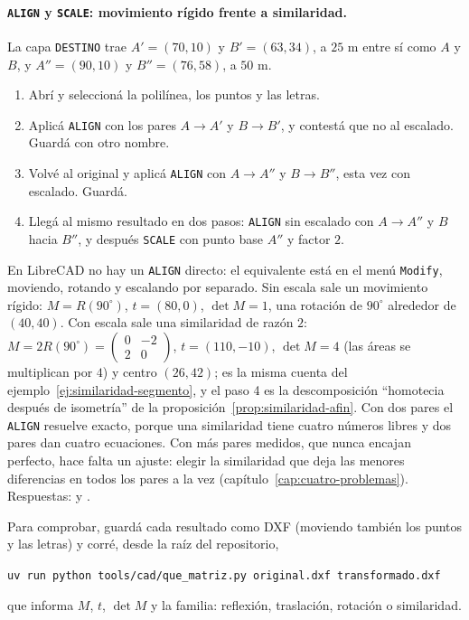 \paragraph{\texttt{ALIGN} y \texttt{SCALE}: movimiento rígido frente a similaridad.} La capa
\texttt{DESTINO} trae \(A'=(70,10)\) y \(B'=(63,34)\), a \(25\) m entre sí como \(A\) y \(B\), y
\(A''=(90,10)\) y \(B''=(76,58)\), a \(50\) m.
\begin{enumerate}
  \item Abrí  y seleccioná la polilínea, los puntos y las letras.
  \item Aplicá \texttt{ALIGN} con los pares \(A\to A'\) y \(B\to B'\), y contestá que no al
  escalado. Guardá con otro nombre.
  \item Volvé al original y aplicá \texttt{ALIGN} con \(A\to A''\) y \(B\to B''\), esta vez
  con escalado. Guardá.
  \item Llegá al mismo resultado en dos pasos: \texttt{ALIGN} sin escalado con \(A\to A''\) y
  \(B\) hacia \(B''\), y después \texttt{SCALE} con punto base \(A''\) y factor \(2\).
\end{enumerate}
En LibreCAD no hay un \texttt{ALIGN} directo: el equivalente está en el menú \texttt{Modify},
moviendo, rotando y escalando por separado. Sin escala sale un movimiento rígido:
\(M=R(90^\circ)\), \(t=(80,0)\), \(\det M=1\), una rotación de \(90^\circ\) alrededor de
\((40,40)\). Con escala sale una similaridad de razón \(2\):
\(M=2R(90^\circ)=\left(\begin{smallmatrix}0&-2\\2&0\end{smallmatrix}\right)\),
\(t=(110,-10)\), \(\det M=4\) (las áreas se multiplican por \(4\)) y centro \((26,42)\); es la
misma cuenta del ejemplo~\ref{ej:similaridad-segmento}, y el paso 4 es la descomposición
\enquote{homotecia después de isometría} de la proposición~\ref{prop:similaridad-afin}. Con dos
pares el \texttt{ALIGN} resuelve exacto, porque una similaridad tiene cuatro números libres y dos
pares dan cuatro ecuaciones. Con más pares medidos, que nunca encajan perfecto, hace falta un
ajuste: elegir la similaridad que deja las menores diferencias en todos los pares a la vez
(capítulo~\ref{cap:cuatro-problemas}). Respuestas:  y
.

Para comprobar, guardá cada resultado como DXF (moviendo también los puntos y las letras) y
corré, desde la raíz del repositorio,
\begin{center}\small
\texttt{uv run python tools/cad/que\_matriz.py original.dxf transformado.dxf}
\end{center}
que informa \(M\), \(t\), \(\det M\) y la familia: reflexión, traslación, rotación o similaridad.

